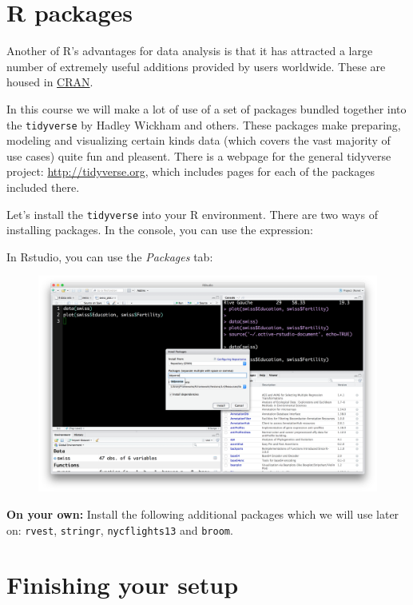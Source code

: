 \documentclass[]{book}
\theoremstyle{definition}
\theoremstyle{definition}
\theoremstyle{remark}
\begin{document}
\section{R packages}\label{r-packages}

Another of R's advantages for data analysis is that it has attracted a
large number of extremely useful additions provided by users worldwide.
These are housed in
\href{https://cran.r-project.org/web/packages/index.html}{CRAN}.

In this course we will make a lot of use of a set of packages bundled
together into the \texttt{tidyverse} by Hadley Wickham and others. These
packages make preparing, modeling and visualizing certain kinds data
(which covers the vast majority of use cases) quite fun and pleasent.
There is a webpage for the general tidyverse project:
\url{http://tidyverse.org}, which includes pages for each of the
packages included there.

Let's install the \texttt{tidyverse} into your R environment. There are
two ways of installing packages. In the console, you can use the
expression:

In Rstudio, you can use the \emph{Packages} tab:

\begin{figure}
\centering
\includegraphics{img/rstudio_install_packages.png}
\caption{}
\end{figure}

\textbf{On your own:} Install the following additional packages which we
will use later on: \texttt{rvest}, \texttt{stringr},
\texttt{nycflights13} and \texttt{broom}.

\section{Finishing your setup}\label{finishing-your-setup}
\end{document}
